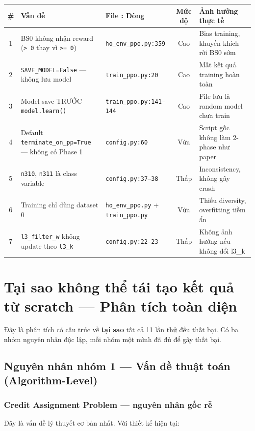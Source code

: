 \documentclass[11pt]{article}
\begin{document}
\begin{longtable}{@{}clp{2.5cm}cp{4cm}@{}}
\toprule
\textbf{\#} & \textbf{Vấn đề} & \textbf{File : Dòng} & \textbf{Mức độ} & \textbf{Ảnh hưởng thực tế} \\
\midrule
\endhead
1 & BS0 không nhận reward (\texttt{> 0} thay vì \texttt{>= 0}) & \texttt{ho\_env\_ppo.py:359} & Cao & Bias training, khuyến khích rời BS0 sớm \\
2 & \texttt{SAVE\_MODEL=False} --- không lưu model & \texttt{train\_ppo.py:20} & Cao & Mất kết quả training hoàn toàn \\
3 & Model save TRƯỚC \texttt{model.learn()} & \texttt{train\_ppo.py:141--144} & Cao & File lưu là random model chưa train \\
4 & Default \texttt{terminate\_on\_pp=True} --- không có Phase 1 & \texttt{config.py:60} & Vừa & Script gốc không làm 2-phase như paper \\
5 & \texttt{n310}, \texttt{n311} là class variable & \texttt{config.py:37--38} & Thấp & Inconsistency, không gây crash \\
6 & Training chỉ dùng dataset 0 & \texttt{ho\_env\_ppo.py} + \texttt{train\_ppo.py} & Vừa & Thiếu diversity, overfitting tiềm ẩn \\
7 & \texttt{l3\_filter\_w} không update theo \texttt{l3\_k} & \texttt{config.py:22--23} & Thấp & Không ảnh hưởng nếu không đổi l3\_k \\
\bottomrule
\end{longtable}

\section{Tại sao không thể tái tạo kết quả từ scratch --- Phân tích toàn diện}

Đây là phân tích có cấu trúc về \textbf{tại sao} tất cả 11 lần thử đều thất bại. Có ba nhóm nguyên nhân độc lập, mỗi nhóm một mình đã đủ để gây thất bại.

\subsection{Nguyên nhân nhóm 1 --- Vấn đề thuật toán (Algorithm-Level)}

\subsubsection{Credit Assignment Problem --- nguyên nhân gốc rễ}

Đây là vấn đề lý thuyết cơ bản nhất. Với thiết kế hiện tại:
\end{document}

